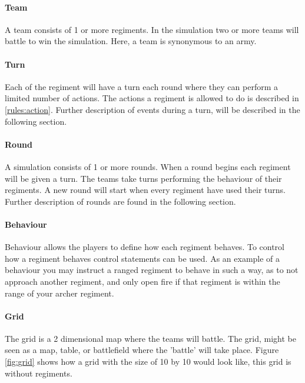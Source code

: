 		\paragraph{Team}		
		A team consists of 1 or more regiments. In the simulation two or more teams will battle to win the simulation. Here, a team is synonymous to an army.
		
		\paragraph{Turn}
		Each of the regiment will have a turn each round where they can perform a limited number of actions. 
		The actions a regiment is allowed to do is described in \ref{rules:action}.
		Further description of events during a turn, will be described in the following section.
		
		\paragraph{Round}
		A simulation consists of 1 or more rounds. When a round begins each regiment will be given a turn.
		The teams take turns performing the behaviour of their regiments. 
		A new round will start when every regiment have used their turns.
		Further description of rounds are found in the following section.

		\paragraph{Behaviour}
		Behaviour allows the players to define how each regiment behaves. 
		To control how a regiment behaves control statements can be used.
		As an example of a behaviour you may instruct a ranged regiment to behave in such a way, 
		as to not approach another regiment, and only open fire if that regiment is within the range of your archer regiment.
				
		\paragraph{Grid}
		The grid is a 2 dimensional map where the teams will battle.
		The grid, might be seen as a map, table, or battlefield where the 'battle' will take place.
		Figure \ref{fig:grid} shows how a grid with the size of 10 by 10 would look like, this grid is without regiments.
		
